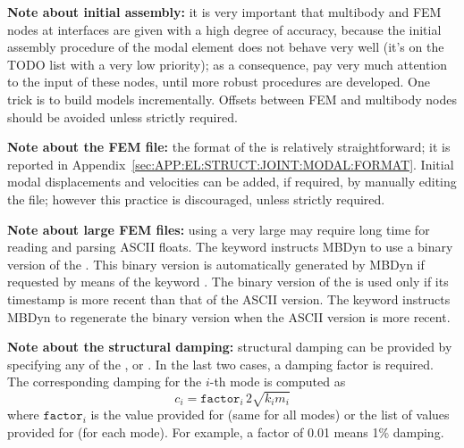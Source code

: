 \noindent
\textbf{Note about initial assembly:} it is very important that multibody 
and FEM nodes at interfaces are given with a high degree of accuracy,
because the initial assembly procedure of the modal element
does not behave very well (it's on the TODO list with a very low
priority); as a consequence, pay very much attention to the input
of these nodes, until more robust procedures are developed.
One trick is to build models incrementally.
Offsets between FEM and multibody nodes 
should be avoided unless strictly required.

\noindent
\textbf{Note about the FEM file:}
the format of the  is relatively straightforward;
it is reported
in Appendix~\ref{sec:APP:EL:STRUCT:JOINT:MODAL:FORMAT}.
Initial modal displacements and velocities can be added,
if required, by manually editing the file; however this practice
is discouraged, unless strictly required.


\noindent
\textbf{Note about large FEM files:}
using a very large  may require long time for
reading and parsing ASCII floats.
The keyword  instructs MBDyn to use a binary version
of the .
This binary version is automatically generated by MBDyn if requested
by means of the keyword .
The binary version of the  is used only if its
timestamp is more recent than that of the ASCII version.
The keyword  instructs MBDyn to regenerate the
binary version when the ASCII version is more recent.

\noindent
\textbf{Note about the structural damping:}
structural damping can be provided by specifying any of the
,  or .
In the last two cases, a damping factor is required.
The corresponding damping for the $i$-th mode is computed as
\begin{displaymath}
	c_i = \mathtt{factor}_i \, 2 \sqrt{k_i m_i}
\end{displaymath}
where $\mathtt{factor}_i$ is the value provided
for  (same for all modes) or the list 
of values provided for  (for each mode).
For example, a factor of 0.01 means 1\% damping.

